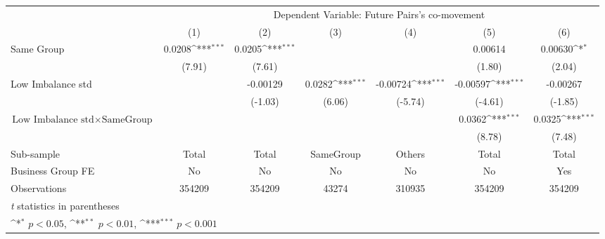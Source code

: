 {
\def\sym#1{\ifmmode^{#1}\else\(^{#1}\)\fi}
\begin{tabular}{l*{6}{c}}
\hline\hline
                &\multicolumn{6}{c}{Dependent Variable:  Future Pairs's co-movement}                                              \\\cmidrule(lr){2-7}
                &\multicolumn{1}{c}{(1)}         &\multicolumn{1}{c}{(2)}         &\multicolumn{1}{c}{(3)}         &\multicolumn{1}{c}{(4)}         &\multicolumn{1}{c}{(5)}         &\multicolumn{1}{c}{(6)}         \\
\hline
Same Group      &   0.0208\sym{***}&   0.0205\sym{***}&                  &                  &  0.00614         &  0.00630\sym{*}  \\
                &   (7.91)         &   (7.61)         &                  &                  &   (1.80)         &   (2.04)         \\
[1em]
Low Imbalance std&                  & -0.00129         &   0.0282\sym{***}& -0.00724\sym{***}& -0.00597\sym{***}& -0.00267         \\
                &                  &  (-1.03)         &   (6.06)         &  (-5.74)         &  (-4.61)         &  (-1.85)         \\
[1em]
 $ \text{Low Imbalance std} \times {\text{SameGroup} } $ &                  &                  &                  &                  &   0.0362\sym{***}&   0.0325\sym{***}\\
                &                  &                  &                  &                  &   (8.78)         &   (7.48)         \\
\hline
Sub-sample      &    Total         &    Total         &SameGroup         &   Others         &    Total         &    Total         \\
Business Group FE&       No         &       No         &       No         &       No         &       No         &      Yes         \\
Observations    &   354209         &   354209         &    43274         &   310935         &   354209         &   354209         \\
\hline\hline
\multicolumn{7}{l}{\footnotesize \textit{t} statistics in parentheses}\\
\multicolumn{7}{l}{\footnotesize \sym{*} \(p<0.05\), \sym{**} \(p<0.01\), \sym{***} \(p<0.001\)}\\
\end{tabular}
}
